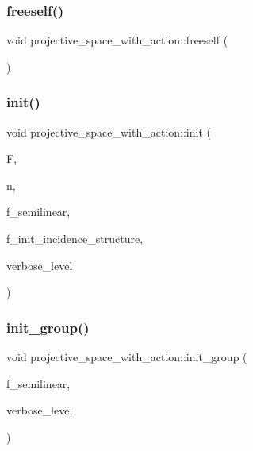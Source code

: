 \subsubsection{\texorpdfstring{freeself()}{freeself()}}
{\footnotesize\ttfamily void projective\+\_\+space\+\_\+with\+\_\+action\+::freeself (\begin{DoxyParamCaption}{ }\end{DoxyParamCaption})}

\mbox{\label{classprojective__space__with__action_a10163a9ca20415bd9a9d4370470143ba}} 
\subsubsection{\texorpdfstring{init()}{init()}}
{\footnotesize\ttfamily void projective\+\_\+space\+\_\+with\+\_\+action\+::init (\begin{DoxyParamCaption}\item[{\mbox{\hyperlink{classfinite__field}{finite\+\_\+field}} $\ast$}]{F,  }\item[{\mbox{\hyperlink{galois_8h_a09fddde158a3a20bd2dcadb609de11dc}{I\+NT}}}]{n,  }\item[{\mbox{\hyperlink{galois_8h_a09fddde158a3a20bd2dcadb609de11dc}{I\+NT}}}]{f\+\_\+semilinear,  }\item[{\mbox{\hyperlink{galois_8h_a09fddde158a3a20bd2dcadb609de11dc}{I\+NT}}}]{f\+\_\+init\+\_\+incidence\+\_\+structure,  }\item[{\mbox{\hyperlink{galois_8h_a09fddde158a3a20bd2dcadb609de11dc}{I\+NT}}}]{verbose\+\_\+level }\end{DoxyParamCaption})}

\mbox{\label{classprojective__space__with__action_a1f23de4057fa97f038b1ec977c9d42c4}} 
\subsubsection{\texorpdfstring{init\+\_\+group()}{init\_group()}}
{\footnotesize\ttfamily void projective\+\_\+space\+\_\+with\+\_\+action\+::init\+\_\+group (\begin{DoxyParamCaption}\item[{\mbox{\hyperlink{galois_8h_a09fddde158a3a20bd2dcadb609de11dc}{I\+NT}}}]{f\+\_\+semilinear,  }\item[{\mbox{\hyperlink{galois_8h_a09fddde158a3a20bd2dcadb609de11dc}{I\+NT}}}]{verbose\+\_\+level }\end{DoxyParamCaption})}

